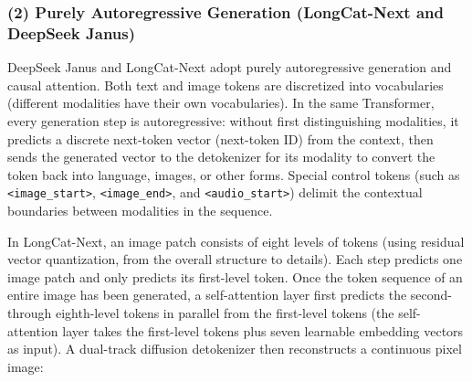 \hypertarget{purely-autoregressive-generation-longcat-next-and-deepseek-janus}{%
\subsubsection{(2) Purely Autoregressive Generation (LongCat-Next and DeepSeek Janus)}\label{purely-autoregressive-generation-longcat-next-and-deepseek-janus}}

DeepSeek Janus and LongCat-Next adopt purely autoregressive generation and causal attention. Both text and image tokens are discretized into vocabularies (different modalities have their own vocabularies). In the same Transformer, every generation step is autoregressive: without first distinguishing modalities, it predicts a discrete next-token vector (next-token ID) from the context, then sends the generated vector to the detokenizer for its modality to convert the token back into language, images, or other forms. Special control tokens (such as \texttt{\textless{}image\_start\textgreater{}}, \texttt{\textless{}image\_end\textgreater{}}, and \texttt{\textless{}audio\_start\textgreater{}}) delimit the contextual boundaries between modalities in the sequence.

In LongCat-Next, an image patch consists of eight levels of tokens (using residual vector quantization, from the overall structure to details). Each step predicts one image patch and only predicts its first-level token. Once the token sequence of an entire image has been generated, a self-attention layer first predicts the second- through eighth-level tokens in parallel from the first-level tokens (the self-attention layer takes the first-level tokens plus seven learnable embedding vectors as input). A dual-track diffusion detokenizer then reconstructs a continuous pixel image:

